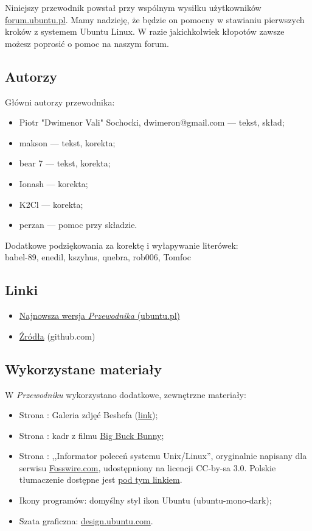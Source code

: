 Niniejszy przewodnik powstał przy wspólnym wysiłku użytkowników \href{http://ubuntu.pl/forum/}{forum.ubuntu.pl}. Mamy nadzieję, że będzie on pomocny w stawianiu pierwszych kroków z systemem Ubuntu Linux. W razie jakichkolwiek kłopotów zawsze możesz poprosić o pomoc na naszym forum.

\subsection{Autorzy}
Główni autorzy przewodnika:
\begin{itemize}
\item Piotr "Dwimenor Vali" Sochocki, dwimeron@gmail.com --- tekst, skład;
\item makson --- tekst, korekta;
\item bear 7 --- tekst, korekta;
\item Ionash --- korekta;
\item K2Cl --- korekta;
\item perzan --- pomoc przy składzie.
\end{itemize}

Dodatkowe podziękowania za korektę i wyłapywanie literówek:\\
babel-89, enedil, kszyhus, qnebra, rob006, Tomfoc

\subsection{Linki}
\begin{itemize}
\item \href{http://ubuntu.pl/dokumenty/Przewodnik_Ubuntu_14.04_LTS_Trusty_Tahr.pdf}{Najnowsza wersja \textit{Przewodnika} (ubuntu.pl)}
\item \href{https://github.com/Dwimenor/Przewodnik-Ubuntu-14.04-LTS-Trusty-Tahr}{Źródła} (github.com)
\end{itemize}

\subsection{Wykorzystane materiały}
W \textit{Przewodniku} wykorzystano dodatkowe, zewnętrzne materiały:
\begin{itemize}
\item Strona \pageref{shotwell}: Galeria zdjęć Beshefa (\href{https://www.flickr.com/photos/sharif/sets/72157600223985436/}{link});
\item Strona \pageref{totem}: kadr z filmu \href{http://www.bigbuckbunny.org}{Big Buck Bunny};
\item Strona \pageref{polecenia}: ,,Informator poleceń systemu Unix/Linux'', oryginalnie napisany dla serwisu \href{http://fosswire.com/}{Fosswire.com}, udostępniony na licencji CC-by-sa 3.0. Polskie tłumaczenie dostępne jest \href{http://czytelnia.ubuntu.pl/index.php/2012/02/24/wydrukuj-i-powies-kolo-monitora-informator-polecen-systemu-unixlinux/}{pod tym linkiem}.
\item Ikony programów: domyślny styl ikon Ubuntu (ubuntu-mono-dark);
\item Szata graficzna: \href{http://design.ubuntu.com/}{design.ubuntu.com}.
\end{itemize}

